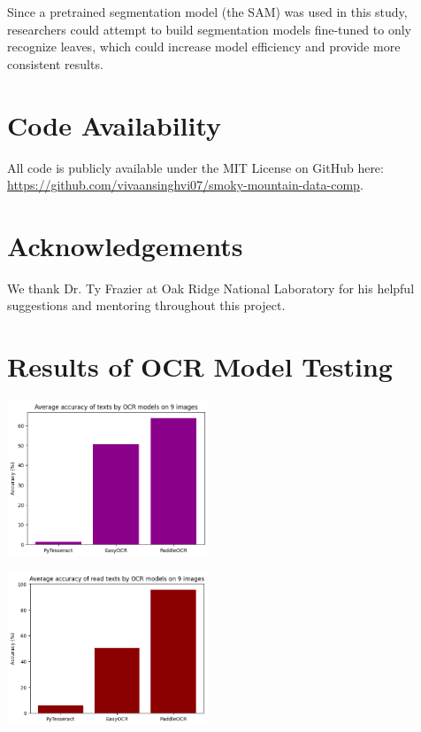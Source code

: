 \documentclass[final,5p,times,twocolumn,authoryear]{elsarticle}
\begin{document}
Since a pretrained segmentation model (the SAM) was used in this study, researchers could attempt to build segmentation models fine-tuned to only recognize leaves, which could increase model efficiency and provide more consistent results.

\section{Code Availability}
\label{code}

All code is publicly available under the MIT License on GitHub here: \url{https://github.com/vivaansinghvi07/smoky-mountain-data-comp}.

\section*{Acknowledgements}
\label{acknowledgements}

We thank Dr. Ty Frazier at Oak Ridge National Laboratory for his helpful suggestions and mentoring throughout this project.





\newpage
\appendix

\section{Results of OCR Model Testing}
\label{app_ocr_testing}

\begin{center}
	\includegraphics[width=0.45\textwidth]{images/ocr_average_accuracy.png}	
\end{center}

\begin{center}
	\includegraphics[width=0.45\textwidth]{images/pruned_ocr_average_accuracy.png}	
\end{center}
\end{document}
